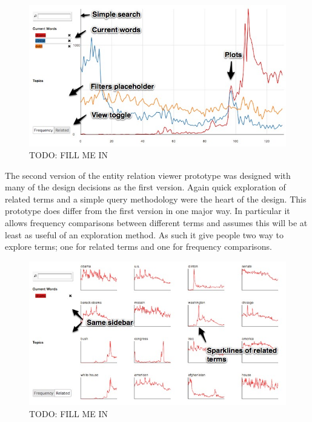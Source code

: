 \begin{figure}[htb]
  \centerline{
    \includegraphics[scale=0.28]{figures/relation-1-a.jpg}
  }
  \caption{TODO: FILL ME IN}
  \label{fig:explorer-1-a}
\end{figure}

The second version of the entity relation viewer prototype was designed with many of the design decisions as the first version. Again quick exploration of related terms and a simple query  methodology were the heart of the design. This prototype does differ from the first version in one major way. In particular it allows frequency comparisons between different terms and assumes this will be at least as useful of an exploration method. As such it give people two way to explore terms; one for related terms and one for frequency comparisons.


\begin{figure}[htb]
  \centerline{
    \includegraphics[scale=0.28]{figures/relation-1-b.jpg}
  }
  \caption{TODO: FILL ME IN}
  \label{fig:explorer-1-b}
\end{figure}
